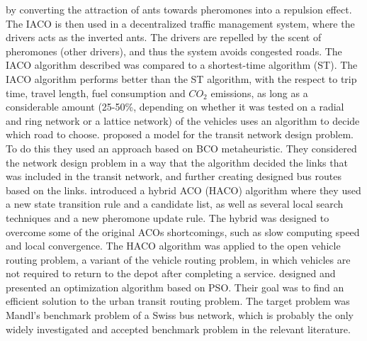 by converting the attraction of ants towards pheromones into a repulsion effect. The IACO is then used in a decentralized traffic management system, where the drivers acts as the inverted ants. The drivers are repelled by the scent of pheromones (other drivers), and thus the system avoids congested roads. The IACO algorithm described was compared to a shortest-time algorithm (ST). The IACO algorithm performs better than the ST algorithm, with the respect to trip time, travel length, fuel consumption and $CO_2$ emissions, as long as a considerable amount (25-50\%, depending on whether it was tested on a radial and ring network or a lattice network) of the vehicles uses an algorithm to decide which road to choose. \citet{nikolic14} proposed a model for the transit network design problem. To do this they used an approach based on BCO metaheuristic. They considered the network design problem in a way that the algorithm decided the links that was included in the transit network, and further creating designed bus routes based on the links. \citet{sedighpour14} introduced a hybrid ACO (HACO) algorithm where they used a new state transition rule and a candidate list, as well as several local search techniques and a new pheromone update rule. The hybrid was designed to overcome some of the original ACOs shortcomings, such as slow computing speed and local convergence. The HACO algorithm was applied to the open vehicle routing problem, a variant of the vehicle routing problem, in which vehicles are not required to return to the depot after completing a service. \citet{kechagiopoulos14} designed and presented an optimization algorithm based on PSO. Their goal was to find an efficient solution to the urban transit routing problem. The target problem was Mandl's benchmark problem of a Swiss bus network, which is probably the only widely investigated and accepted benchmark problem in the relevant literature. 




